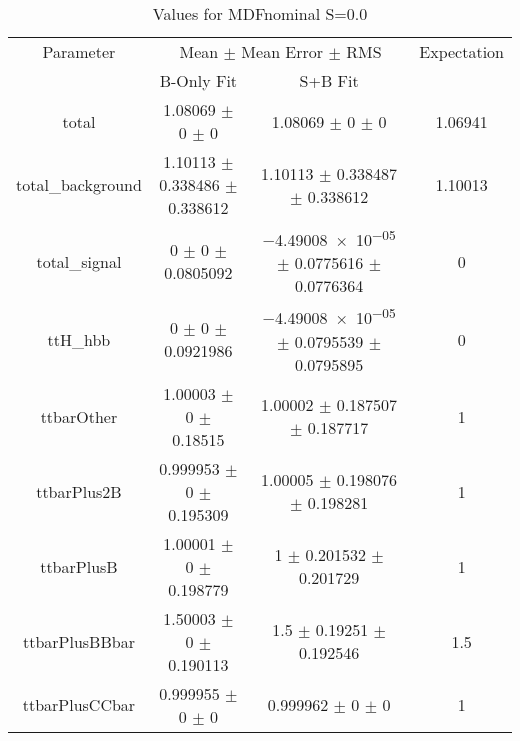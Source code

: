 \begin{table}
\centering
\caption{Values for MDFnominal S=0.0}
\begin{tabular}{cccc}
\toprule
Parameter & \multicolumn{2}{c}{Mean $\pm$ Mean Error $\pm$ RMS} & Expectation\\
 & B-Only Fit & S+B Fit & \\
\midrule
total & \num{1.08069} $\pm$ \num{0} $\pm$ \num{0} & \num{1.08069} $\pm$ \num{0} $\pm$ \num{0} & \num{1.06941}\\
total\_background & \num{1.10113} $\pm$ \num{0.338486} $\pm$ \num{0.338612} & \num{1.10113} $\pm$ \num{0.338487} $\pm$ \num{0.338612} & \num{1.10013}\\
total\_signal & \num{0} $\pm$ \num{0} $\pm$ \num{0.0805092} & \num{-4.49008e-05} $\pm$ \num{0.0775616} $\pm$ \num{0.0776364} & \num{0}\\
ttH\_hbb & \num{0} $\pm$ \num{0} $\pm$ \num{0.0921986} & \num{-4.49008e-05} $\pm$ \num{0.0795539} $\pm$ \num{0.0795895} & \num{0}\\
ttbarOther & \num{1.00003} $\pm$ \num{0} $\pm$ \num{0.18515} & \num{1.00002} $\pm$ \num{0.187507} $\pm$ \num{0.187717} & \num{1}\\
ttbarPlus2B & \num{0.999953} $\pm$ \num{0} $\pm$ \num{0.195309} & \num{1.00005} $\pm$ \num{0.198076} $\pm$ \num{0.198281} & \num{1}\\
ttbarPlusB & \num{1.00001} $\pm$ \num{0} $\pm$ \num{0.198779} & \num{1} $\pm$ \num{0.201532} $\pm$ \num{0.201729} & \num{1}\\
ttbarPlusBBbar & \num{1.50003} $\pm$ \num{0} $\pm$ \num{0.190113} & \num{1.5} $\pm$ \num{0.19251} $\pm$ \num{0.192546} & \num{1.5}\\
ttbarPlusCCbar & \num{0.999955} $\pm$ \num{0} $\pm$ \num{0} & \num{0.999962} $\pm$ \num{0} $\pm$ \num{0} & \num{1}\\
\bottomrule
\end{tabular}
\end{table}